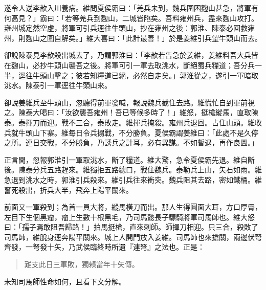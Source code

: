 遂令人送李歆入川養病。維問夏侯霸曰：「羌兵未到，魏兵圍困麴山甚急，將軍有何高見？」霸曰：「若等羌兵到麴山，二城皆陷矣。吾料雍州兵，盡來麴山攻打。雍州城定然空虛，將軍可引兵逕往牛頭山，抄在雍州之後：郭淮、陳泰必回救雍州，則麴山之圍自解矣。」維大喜曰：「此計最善！」於是姜維引兵望牛頭山而去。

卻說陳泰見李歆殺出城去了，乃謂郭淮曰：「李歆若告急於姜維，姜維料吾大兵皆在麴山，必抄牛頭山襲吾之後。將軍可引一軍去取洮水，斷絕蜀兵糧道；吾分兵一半，逕往牛頭山擊之；彼若知糧道已絕，必然自走矣。」郭淮從之，遂引一軍暗取洮水。陳泰引一軍逕往牛頭山來。

卻說姜維兵至牛頭山，忽聽得前軍發喊，報說魏兵截住去路。維慌忙自到軍前視之。陳泰大喝曰：「汝欲襲吾雍州！吾已等候多時了！」維怒，挺槍縱馬，直取陳泰。泰揮刀而迎。戰不三合，泰敗走。維揮兵掩殺。雍州兵退回。占住山頭。維收兵就牛頭山下寨。維每日令兵搦戰，不分勝負。夏侯霸謂姜維曰：「此處不是久停之所。連日交戰，不分勝負，乃誘兵之計耳，必有異謀。不如暫退，再作良圖。」

正言間，忽報郭淮引一軍取洮水，斷了糧道。維大驚，急令夏侯霸先退。維自斷後。陳泰分兵五路趕來。維獨拒五路總口，戰住魏兵。泰勒兵上山，矢石如雨。維急退到洮水之時，郭淮引兵殺來。維引兵往來衝突。魏兵阻其去路，密如鐵桶。維奮死殺出，折兵大半，飛奔上陽平關來。

前面又一軍殺到；為首一員大將，縱馬橫刀而出。那人生得圓面大耳，方口厚脣，左目下生個黑瘤，瘤上生數十根黑毛，乃司馬懿長子驃騎將軍司馬師也。維大怒曰：「孺子焉敢阻吾歸路！」拍馬挺槍，直來刺師。師揮刀相迎。只三合，殺敗了司馬師，維脫身逕奔陽平關來。城上人開門放入姜維。司馬師也來搶關，兩邊伏弩齊發，一弩發十矢，乃武侯臨終時所遺『連弩』之法也。正是：

\begin{quote}
難支此日三軍敗，獨賴當年十矢傳。
\end{quote}

未知司馬師性命如何，且看下文分解。
